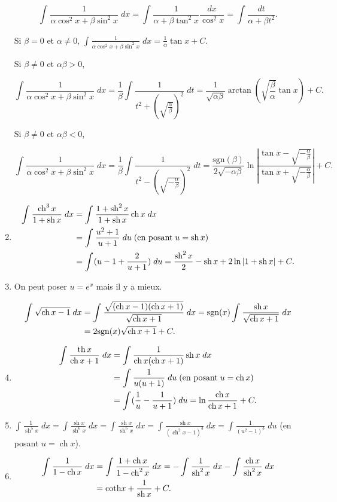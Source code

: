 \documentclass[11pt,a4paper]{article}
\newcommand{\ch}{\mathop{\mathrm{ch}}\nolimits}
\newcommand{\sh}{\mathop{\mathrm{sh}}\nolimits}
\renewcommand{\tanh}{\mathop{\mathrm{th}}\nolimits}
\newcommand{\Arctan}{\mathop{\mathrm{arctan}}\nolimits}
\begin{document}
\begin{enumerate}
$$\int_{}^{}\frac{1}{\alpha\cos^2x+\beta\sin^2 x}\;dx=\int_{}^{}\frac{1}{\alpha+\beta\tan^2x}\frac{dx}{\cos^2x}=\int_{}^{}\frac{dt}{\alpha+\beta t^2}.$$

Si $\beta=0$ et $\alpha\neq0$, $\int_{}^{}\frac{1}{\alpha\cos^2x+\beta\sin^2x}\;dx=\frac{1}{\alpha}\tan x+C$.

Si $\beta\neq0$ et $\alpha\beta>0$, 

$$\int_{}^{}\frac{1}{\alpha\cos^2x+\beta\sin^2 x}\;dx=\frac{1}{\beta}\int_{}^{}\frac{1}{t^2+(\sqrt{\frac{\alpha}{\beta}})^2}\;dt=\frac{1}{\sqrt{\alpha\beta}}\Arctan(\sqrt{\frac{\beta}{\alpha}}\tan x)+C.$$

Si $\beta\neq0$ et $\alpha\beta<0$, 

$$\int_{}^{}\frac{1}{\alpha\cos^2x+\beta\sin^2 x}\;dx=\frac{1}{\beta}\int_{}^{}\frac{1}{t^2-(\sqrt{-\frac{\alpha}{\beta}})^2}\;dt=\frac{\mbox{sgn}(\beta)}
{2\sqrt{-\alpha\beta}}\ln\left|\frac{\tan x-\sqrt{-\frac{\alpha}{\beta}}}{\tan x+\sqrt{-\frac{\alpha}{\beta}}}\right|+C.$$

\item  \begin{align*}\ensuremath
\int_{}^{}\frac{\ch^3x}{1+\sh x}\;dx&=\int_{}^{}\frac{1+\sh^2x}{1+\sh x}\ch x\;dx\\
 &=\int_{}^{}\frac{u^2+1}{u+1}\;du\;(\mbox{en posant}\;u=\sh x)\\
 &=\int_{}^{}(u-1+\frac{2}{u+1})\;du=\frac{\sh^2x}{2}-\sh x+2\ln|1+\sh x|+C.
\end{align*}
\item  On peut poser $u=e^x$ mais il y a mieux.

\begin{align*}\ensuremath
\int_{}^{}\sqrt{\ch x-1}\;dx&=\int_{}^{}\frac{\sqrt{(\ch x-1)(\ch x+1)}}{\sqrt{\ch x+1}}\;dx=\mbox{sgn}(x)\int_{}^{}\frac{\sh x}{\sqrt{\ch x+1}}\;dx\\
 &=2\mbox{sgn}(x)\sqrt{\ch x+1}+C.
\end{align*}

\item
\begin{align*}\ensuremath
\int_{}^{}\frac{\tanh x}{\ch x+1}\;dx&=\int_{}^{}\frac{1}{\ch x(\ch x+1)}\sh x\;dx\\
 &=\int_{}^{}\frac{1}{u(u+1)}\;du\;(\mbox{en posant}\;u=\ch x)\\
 &=\int_{}^{}(\frac{1}{u}-\frac{1}{u+1})\;du=\ln\frac{\ch x}{\ch x+1}+C.
\end{align*}

\item $\int_{}^{}\frac{1}{\sh^5x}\;dx=\int_{}^{}\frac{\sh x}{\sh^6x}\;dx
=\int_{}^{}\frac{\sh x}{\sh^6x}\;dx=\int_{}^{}\frac{\sh x}{(\ch^2x-1)^3}\;dx=\int_{}^{}\frac{1}{(u^2-1)^3}\;du$ (en posant $u=\ch x$).

\item

\begin{align*}\ensuremath
\int_{}^{}\frac{1}{1-\ch x}\;dx&=\int_{}^{}\frac{1+\ch x}{1-\ch^2x}\;dx=-\int_{}^{}\frac{1}{\sh^2x}\;dx-\int_{}^{}\frac{\ch x}{\sh^2x}\;dx\\
 &=\mbox{coth}x+\frac{1}{\sh x}+C.
\end{align*}
\end{enumerate}
\end{document}
